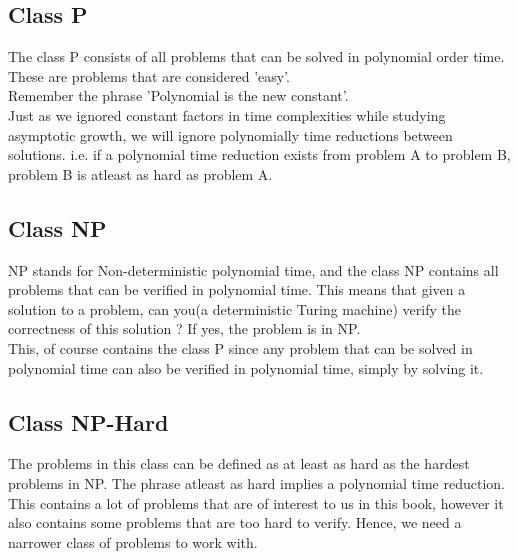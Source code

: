\documentclass[12pt]{report}
\begin{document}
\subsection*{Class P}
The class P consists of all problems that can be solved in polynomial order time. These are problems that are considered 'easy'.\\
Remember the phrase 'Polynomial is the new constant'.\\
Just as we ignored constant factors in time complexities while studying asymptotic growth, we will ignore polynomially time reductions between solutions. i.e. if a polynomial time reduction exists from problem A to problem B, problem B is atleast as hard as problem A. 

\subsection*{Class NP}
NP stands for Non-deterministic polynomial time, and the class NP contains all problems that can be verified in polynomial time. This means that given a solution to a problem, can you(a deterministic Turing machine) verify the correctness of this solution ? If yes, the problem is in NP. \\
This, of course contains the class P since any problem that can be solved in polynomial time can also be verified in polynomial time, simply by solving it.

\subsection*{Class NP-Hard}
The problems in this class can be defined as at least as hard as the hardest problems in NP. The phrase atleast as hard implies a polynomial time reduction. This contains a lot of problems that are of interest to us in this book, however it also contains some problems that are too hard to verify. Hence, we need a narrower class of problems to work with.
\end{document}
